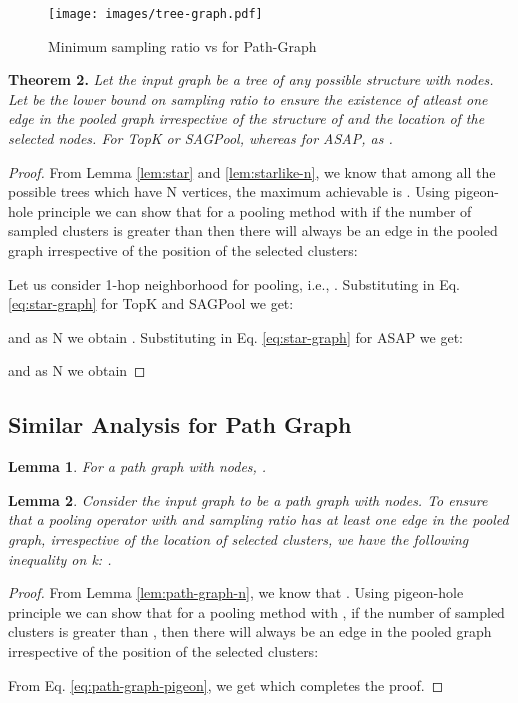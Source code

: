 \documentclass[letterpaper]{article} \usepackage{aaai20}  \usepackage{times}  \usepackage{helvet} \usepackage{courier}  \usepackage[hyphens]{url}  \usepackage{graphicx} \urlstyle{rm} \def\UrlFont{\rm}  \usepackage{graphicx}  \frenchspacing  \setlength{\pdfpagewidth}{8.5in}  \setlength{\pdfpageheight}{11in}
\newtheorem{lemma}{Lemma}
\begin{document}
	\begin{figure}[!ht]
	\centering
	\texttt{[image: images/tree-graph.pdf]}
	\caption{\label{fig:tree-graph} Minimum sampling ratio  vs  for Path-Graph}
	\end{figure}



	
\textbf{Theorem 2.}
	\textit{
		Let the input graph  be a tree of any possible structure with  nodes. Let  be the lower bound on sampling ratio  to ensure the existence of atleast one edge in the pooled graph irrespective of the structure of  and the location of the selected nodes. For TopK or SAGPool,  whereas for ASAP,  as .
	}
	\begin{proof}
		From Lemma \eqref{lem:star} and \eqref{lem:starlike-n}, we know that among all the possible trees  which have N vertices, the maximum  achievable is . Using pigeon-hole principle we can show that for a pooling method with  if the number of sampled clusters is greater than  then there will always be an edge in the pooled graph irrespective of the position of the selected clusters: 
		
		Let us consider 1-hop neighborhood for pooling, i.e., . Substituting  in Eq. \eqref{eq:star-graph} for TopK and SAGPool we get:
		
		and as N  we obtain . Substituting  in Eq. \eqref{eq:star-graph} for ASAP we get:
		
		and as N  we obtain 
	\end{proof}
	
	


	
	
	
\subsection{\Large Similar Analysis for Path Graph}
	\label{ssec:proof-3}
	
	
	
	\begin{lemma}
		\label{lem:path-graph-n}
		For a path graph  with  nodes, .
	\end{lemma}
	
	
\begin{lemma}
		\label{lem:path-graph}
		Consider the input graph to be a path graph  with  nodes. To ensure that a pooling operator with  and sampling ratio  has at least one edge in the pooled graph, irrespective of the location of selected clusters, we have the following inequality on k: .
	\end{lemma}
	\begin{proof}
		From Lemma \eqref{lem:path-graph-n}, we know that . Using pigeon-hole principle we can show that for a pooling method with , if the number of sampled clusters is greater than , then there will always be an edge in the pooled graph irrespective of the position of the selected clusters: 
		
		From Eq. \eqref{eq:path-graph-pigeon}, we get  which completes the proof.
	\end{proof}
	
\end{document}
